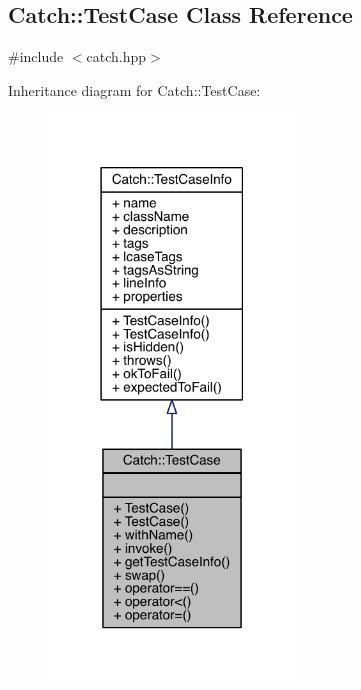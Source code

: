 \hypertarget{a00085}{}\subsection{Catch\+:\+:Test\+Case Class Reference}
\label{a00085}


{\ttfamily \#include $<$catch.\+hpp$>$}



Inheritance diagram for Catch\+:\+:Test\+Case\+:\nopagebreak
\begin{figure}[H]
\begin{center}
\leavevmode
\includegraphics[width=186pt]{a00283}
\end{center}
\end{figure}


